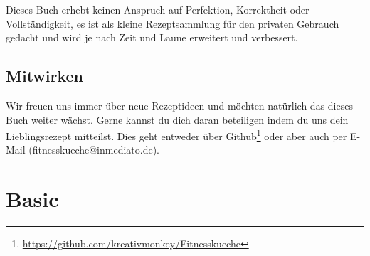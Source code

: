 \documentclass[a4paper]{scrartcl}
\begin{document}
Dieses Buch erhebt keinen Anspruch auf Perfektion, Korrektheit oder Vollständigkeit, es ist als kleine Rezeptsammlung für den privaten Gebrauch gedacht und wird je nach Zeit und Laune erweitert und verbessert.

\subsection*{Mitwirken}
Wir freuen uns immer über neue Rezeptideen und möchten natürlich das dieses Buch weiter wächst. Gerne kannst du dich daran beteiligen indem du uns dein Lieblingsrezept mitteilst. Dies geht entweder über Github\footnote{\url{https://github.com/kreativmonkey/Fitnesskueche}} oder aber auch per E-Mail (fitnesskueche@inmediato.de). 

%
%
%
\printnomenclature



\section{Basic} %



%




\end{document}
